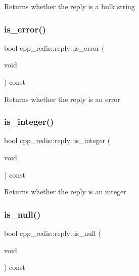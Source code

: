 \begin{DoxyReturn}{Returns}
whether the reply is a bulk string 
\end{DoxyReturn}
\mbox{\label{classcpp__redis_1_1reply_af61ba1b5a0617c0036fb69e7ad5ee159}} 
\subsubsection{\texorpdfstring{is\+\_\+error()}{is\_error()}}
{\footnotesize\ttfamily bool cpp\+\_\+redis\+::reply\+::is\+\_\+error (\begin{DoxyParamCaption}\item[{void}]{ }\end{DoxyParamCaption}) const}

\begin{DoxyReturn}{Returns}
whether the reply is an error 
\end{DoxyReturn}
\mbox{\label{classcpp__redis_1_1reply_a75216234d6aafd8f81025b22bdbb4440}} 
\subsubsection{\texorpdfstring{is\+\_\+integer()}{is\_integer()}}
{\footnotesize\ttfamily bool cpp\+\_\+redis\+::reply\+::is\+\_\+integer (\begin{DoxyParamCaption}\item[{void}]{ }\end{DoxyParamCaption}) const}

\begin{DoxyReturn}{Returns}
whether the reply is an integer 
\end{DoxyReturn}
\mbox{\label{classcpp__redis_1_1reply_ac9a967c09aad1cdc7ec3459a330ab274}} 
\subsubsection{\texorpdfstring{is\+\_\+null()}{is\_null()}}
{\footnotesize\ttfamily bool cpp\+\_\+redis\+::reply\+::is\+\_\+null (\begin{DoxyParamCaption}\item[{void}]{ }\end{DoxyParamCaption}) const}


